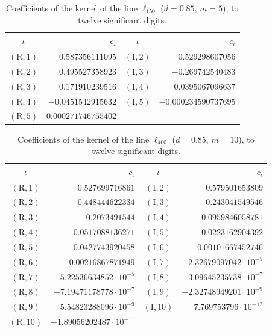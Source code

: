 \documentclass[11pt,reqno]{amsart}
\numberwithin{equation}{section}
\theoremstyle{definition}
\theoremstyle{remark}
\begin{document}
\begin{table}[ht]\centering\small
\begin{tabular}{@{}cr@{\quad}cr@{}}\toprule $\iota$ & $c_\iota$ & $\iota$ & $c_\iota$\\\midrule
$(\mathrm R,1)$ & $0.587356111095$ & $(\mathrm I,2)$ & $0.529298607056$\\
$(\mathrm R,2)$ & $0.495527358923$ & $(\mathrm I,3)$ & $-0.269742540483$\\
$(\mathrm R,3)$ & $0.171910239516$ & $(\mathrm I,4)$ & $0.0395067096637$\\
$(\mathrm R,4)$ & $-0.0451542915632$ & $(\mathrm I,5)$ & $-0.000234590737695$\\
$(\mathrm R,5)$ & $0.000271746755402$ & & \\
\bottomrule\end{tabular}
\caption{Coefficients of the kernel of the line $\ell_{150}$ ($d=0.85$, $m=5$), to twelve significant digits.}\label{tab:kernel_L150}\end{table}

\begin{table}[ht]\centering\small
\begin{tabular}{@{}cr@{\quad}cr@{}}\toprule $\iota$ & $c_\iota$ & $\iota$ & $c_\iota$\\\midrule
$(\mathrm R,1)$ & $0.527699716861$ & $(\mathrm I,2)$ & $0.579501653809$\\
$(\mathrm R,2)$ & $0.448444622334$ & $(\mathrm I,3)$ & $-0.243041549546$\\
$(\mathrm R,3)$ & $0.2073491544$ & $(\mathrm I,4)$ & $0.0959846058781$\\
$(\mathrm R,4)$ & $-0.0517088136271$ & $(\mathrm I,5)$ & $-0.0223162904392$\\
$(\mathrm R,5)$ & $0.0427743920458$ & $(\mathrm I,6)$ & $0.00101667452746$\\
$(\mathrm R,6)$ & $-0.00216867871949$ & $(\mathrm I,7)$ & $-2.32679097042\cdot10^{-5}$\\
$(\mathrm R,7)$ & $5.22536634852\cdot10^{-5}$ & $(\mathrm I,8)$ & $3.09645235738\cdot10^{-7}$\\
$(\mathrm R,8)$ & $-7.19471178778\cdot10^{-7}$ & $(\mathrm I,9)$ & $-2.32748949201\cdot10^{-9}$\\
$(\mathrm R,9)$ & $5.54823288096\cdot10^{-9}$ & $(\mathrm I,10)$ & $7.769753796\cdot10^{-12}$\\
$(\mathrm R,10)$ & $-1.89056202487\cdot10^{-11}$ & & \\
\bottomrule\end{tabular}
\caption{Coefficients of the kernel of the line $\ell_{400}$ ($d=0.85$, $m=10$), to twelve significant digits.}\label{tab:kernel_C400}\end{table}
\end{document}
